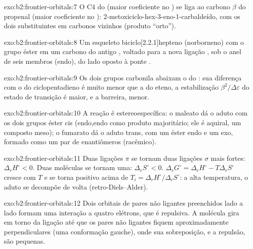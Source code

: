 \begin{solution}{exo:b2:frontier-orbitals:7}
O C4 do  (maior coeficiente no ) se liga ao carbono $\beta$ do propenal
(maior coeficiente no ): 2-metoxiciclo-hex-3-eno-1-carbaldeído, com os dois
substituintes em carbonos vizinhos (produto ``orto'').
\end{solution}

\begin{solution}{exo:b2:frontier-orbitals:8}
Um esqueleto biciclo[2.2.1]hepteno (norborneno) com o grupo éster em um carbono
do antigo , voltado para a nova ligação , sob o anel de seis
membros (endo), do lado oposto à ponte .
\end{solution}

\begin{solution}{exo:b2:frontier-orbitals:9}
Os dois grupos carbonila abaixam o  do : sua diferença com o 
do ciclopentadieno é muito menor que a do eteno, a estabilização
$\beta^2/\Delta\varepsilon$ do estado de transição é maior, e a barreira, menor.
\end{solution}

\begin{solution}{exo:b2:frontier-orbitals:10}
A reação é estereoespecífica: o maleato dá o aduto com os dois grupos éster cis
(endo,endo como produto majoritário; ele é aquiral, um composto meso); o
fumarato dá o aduto trans, com um éster endo e um exo, formado como um par de
enantiômeros (racêmico).
\end{solution}

\begin{solution}{exo:b2:frontier-orbitals:11}
Duas ligações $\pi$ se tornam duas ligações $\sigma$ mais fortes: $\Delta_r H^\circ < 0$.
Duas moléculas se tornam uma:
$\Delta_r S^\circ < 0$. $\Delta_r G^\circ = \Delta_r H^\circ - T\Delta_r S^\circ$ cresce com $T$ e se torna
positivo acima de $T_i = \Delta_r H^\circ/\Delta_r S^\circ$: a alta temperatura, o aduto se
decompõe de volta (retro-Diels--Alder).
\end{solution}

\begin{solution}{exo:b2:frontier-orbitals:12}
Dois orbitais de pares não ligantes preenchidos lado a lado formam uma
interação a quatro elétrons, que é repulsiva. A molécula gira em torno da
ligação  até que os pares não ligantes fiquem aproximadamente
perpendiculares (uma conformação gauche), onde sua sobreposição, e a repulsão,
são pequenas.
\end{solution}

